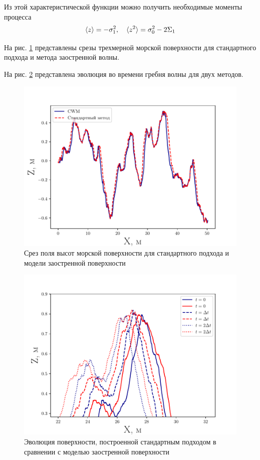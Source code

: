 Из этой характеристической функции можно получить необходимые моменты процесса
\begin{equation}
    \label{eq:}
    \langle z\rangle = - \sigma_1^2, \quad \langle z^2\rangle = \sigma_0^2 - 2 \Sigma_1
\end{equation}
 
На рис. \ref{fig:cwm} представлены срезы трехмерной морской поверхности 
для стандартного подхода и метода заостренной волны. 

На рис. \ref{fig:evolution} представлена эволюция во времени гребня волны для
двух методов. 
\begin{figure}[h!]
    \centering
    \includegraphics[width=0.8\linewidth]{fig/cwm}
    \caption{Срез поля высот морской поверхности для стандартного подхода и
    модели заостренной поверхности}
    \label{fig:cwm}
\end{figure}

\begin{figure}[h!]
    \centering
    \includegraphics[width=0.8\linewidth]{fig/evolution}
    \caption{Эволюция поверхности, построенной стандартным подходом в сравнении
    с моделью заостренной поверхности}
    \label{fig:evolution}
\end{figure}



